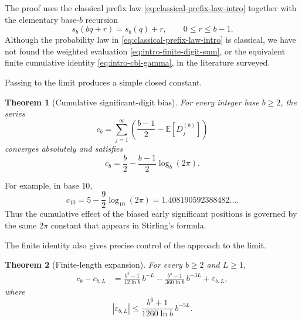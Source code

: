 \documentclass[11pt]{article}
\newtheorem{theorem}{Theorem}[section]
\theoremstyle{definition}
\theoremstyle{remark}
\begin{document}
The proof uses the classical prefix law
\eqref{eq:classical-prefix-law-intro} together with the elementary
base-\(b\) recursion
\[
    s_b(bq+r)=s_b(q)+r,
    \qquad 0\le r\le b-1.
\]
Although the probability law in
\eqref{eq:classical-prefix-law-intro} is classical, we have not found
the weighted evaluation
\eqref{eq:intro-finite-digit-sum}, or the equivalent finite cumulative
identity \eqref{eq:intro-cbl-gamma}, in the literature surveyed.

Passing to the limit produces a simple closed constant.

\begin{theorem}[Cumulative significant-digit bias]
\label{thm:intro-cb}
For every integer base \(b\ge2\), the series
\[
    c_b
    =
    \sum_{j=1}^{\infty}
    \left(
        \frac{b-1}{2}
        -
        \mathbb E[D_j^{(b)}]
    \right)
\]
converges absolutely and satisfies
\begin{equation}
\boxed{
    c_b
    =
    \frac{b}{2}
    -
    \frac{b-1}{2}\log_b(2\pi).
}
\label{eq:intro-cb}
\end{equation}
\end{theorem}

For example, in base \(10\),
\begin{equation}
    c_{10}
    =
    5-\frac{9}{2}\log_{10}(2\pi)
    =
    1.408190592388482\ldots.
    \label{eq:intro-c10}
\end{equation}
Thus the cumulative effect of the biased early significant positions
is governed by the same \(2\pi\) constant that appears in Stirling's
formula.

The finite identity also gives precise control of the approach to the
limit.

\begin{theorem}[Finite-length expansion]
\label{thm:intro-tail}
For every \(b\ge2\) and \(L\ge1\),
\begin{equation}
\begin{aligned}
    c_b-c_{b,L}
    &=
    \frac{b^2-1}{12\ln b}\,b^{-L}
    -
    \frac{b^4-1}{360\ln b}\,b^{-3L}
    +
    \varepsilon_{b,L},
\end{aligned}
\label{eq:intro-tail-expansion}
\end{equation}
where
\begin{equation}
\boxed{
    |\varepsilon_{b,L}|
    \le
    \frac{b^6+1}{1260\ln b}\,b^{-5L}.
}
\label{eq:intro-tail-remainder}
\end{equation}
\end{theorem}
\end{document}
